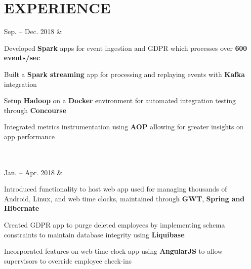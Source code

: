 \documentclass[]{richard-dang}
\begin{document}
\section*{EXPERIENCE}
\medbreak
\begin{tabularcv}
    Sep. – \newline 
    Dec. 2018   &  
                    \href{https://www.ultimatesoftware.com}{
                    }
                    \begin{tabitemize}
                        \item Developed \textbf{Spark} apps for event ingestion and GDPR which processes over \textbf{600 events/sec}
                        \item Built a \textbf{Spark streaming} app for processing and replaying events with \textbf{Kafka} integration
                        \item Setup \textbf{Hadoop} on a \textbf{Docker} environment for automated integration testing through \textbf{Concourse}
                        \item Integrated metrics instrumentation using \textbf{AOP} allowing for greater insights on app performance 
                    \end{tabitemize} 
                    \\[\vspacepar]\\[\vspacepar]
    Jan. – \newline 
    Apr. 2018   &  
                    \href{https://www.ultimatesoftware.com}{
                    }
                    \begin{tabitemize}
                        \item Introduced functionality to host web app used for managing thousands of Android, Linux, and web time clocks, maintained through \textbf{GWT}, \textbf{Spring and Hibernate}
                        \item Created GDPR app to purge deleted employees by implementing schema constraints to maintain database integrity using \textbf{Liquibase}
                        \item Incorporated features on web time clock app using \textbf{AngularJS} to allow supervisors to override employee check-ins
                    \end{tabitemize} 
                    \\[\vspacepar]\\[\vspacepar]

\end{tabularcv}
\end{document}
